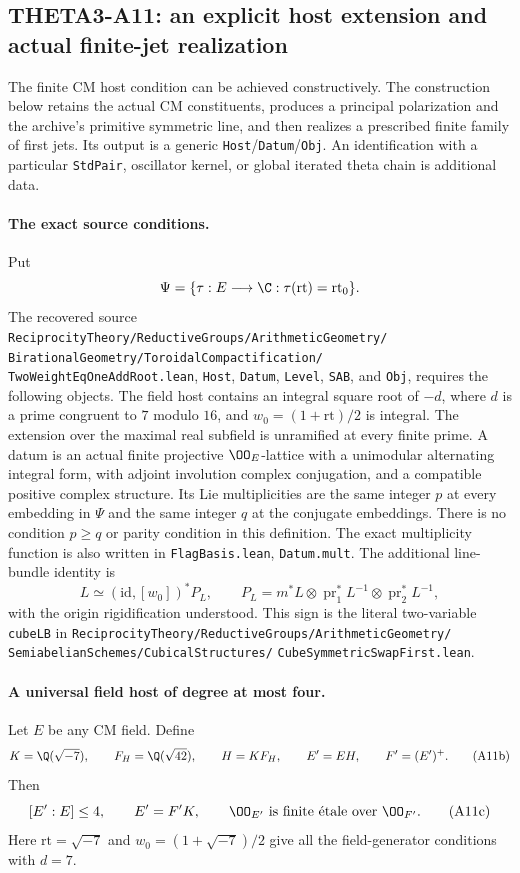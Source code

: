 \subsection{THETA3-A11: an explicit host extension and actual finite-jet realization}
\label{A11}

The finite CM host condition can be achieved constructively.  The
construction below retains the actual CM constituents, produces a
principal polarization and the archive's primitive symmetric line,
and then realizes a prescribed finite family of first jets.  Its
output is a generic \texttt{Host}/\texttt{Datum}/\texttt{Obj}.  An
identification with a particular \texttt{StdPair}, oscillator kernel,
or global iterated theta chain is additional data.

\paragraph{The exact source conditions.}
Put
\[
 \Psi=\{\tau:E\longrightarrow\C:\tau(\mathrm{rt})=\mathrm{rt}_0\}.
\]
The recovered source
\texttt{ReciprocityTheory/ReductiveGroups/ArithmeticGeometry/}
\texttt{BirationalGeometry/ToroidalCompactification/}
\texttt{TwoWeightEqOneAddRoot.lean},
\texttt{Host}, \texttt{Datum}, \texttt{Level}, \texttt{SAB},
and \texttt{Obj}, requires the following objects.  The field host
contains an integral square root of $-d$, where $d$ is a prime
congruent to $7$ modulo $16$, and $w_0=(1+\mathrm{rt})/2$ is
integral.  The extension over the maximal real subfield is
unramified at every finite prime.  A datum is an actual finite
projective $\OO_E$-lattice with a unimodular alternating integral
form, with adjoint involution complex conjugation, and a compatible
positive complex structure.  Its Lie multiplicities are the same
integer $p$ at every embedding in $\Psi$ and the same integer $q$
at the conjugate embeddings.  There is no condition $p\geq q$ or
parity condition in this definition.  The exact multiplicity
function is also written in \texttt{FlagBasis.lean},
\texttt{Datum.mult}.  The additional line-bundle identity is
\[
       L\simeq(\mathrm{id},[w_0])^*P_L,\qquad
       P_L=m^*L\otimes\operatorname{pr}_1^*L^{-1}
                    \otimes\operatorname{pr}_2^*L^{-1},
 \tag{A11a}
\]
with the origin rigidification understood.  This sign is the
literal two-variable \texttt{cubeLB} in
\texttt{ReciprocityTheory/ReductiveGroups/ArithmeticGeometry/}
\texttt{SemiabelianSchemes/CubicalStructures/}
\texttt{CubeSymmetricSwapFirst.lean}.

\paragraph{A universal field host of degree at most four.}
Let $E$ be any CM field.  Define
\[
 K=\Q(\sqrt{-7}),\qquad F_H=\Q(\sqrt{42}),\qquad
 H=K F_H,\qquad E'=EH,\qquad F'=(E')^+.
 \tag{A11b}
\]
Then
\[
 [E':E]\leq4,\qquad
 E'=F'K,\qquad
 \OO_{E'}\text{ is finite \'etale over }\OO_{F'}.
 \tag{A11c}
\]
Here $\mathrm{rt}=\sqrt{-7}$ and $w_0=(1+\sqrt{-7})/2$ give
all the field-generator conditions with $d=7$.

